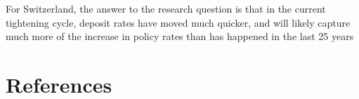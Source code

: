 \documentclass{article}
\begin{document}
For Switzerland, the answer to the research question is that in the current tightening cycle, deposit rates have moved much quicker, and will likely capture much more of the increase in policy rates than has happened in the last 25 years


\newpage  %
\section{References}
\printbibliography[heading=none] 
\end{document}

